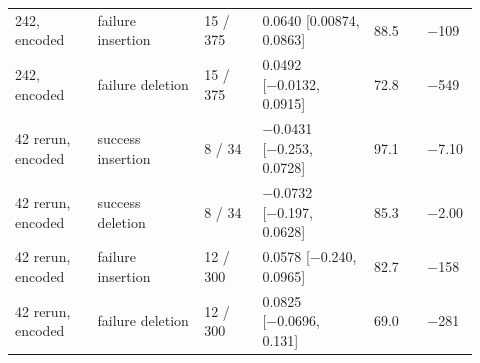 \begin{longtable}{p{0.170\linewidth} p{0.220\linewidth} p{0.120\linewidth} p{0.230\linewidth} p{0.110\linewidth} p{0.070\linewidth}}
242, encoded & failure insertion & 15 / 375 & 0.0640 [0.00874, 0.0863] & 88.5 & −109 \\
242, encoded & failure deletion & 15 / 375 & 0.0492 [−0.0132, 0.0915] & 72.8 & −549 \\
42 rerun, encoded & success insertion & 8 / 34 & −0.0431 [−0.253, 0.0728] & 97.1 & −7.10 \\
42 rerun, encoded & success deletion & 8 / 34 & −0.0732 [−0.197, 0.0628] & 85.3 & −2.00 \\
42 rerun, encoded & failure insertion & 12 / 300 & 0.0578 [−0.240, 0.0965] & 82.7 & −158 \\
42 rerun, encoded & failure deletion & 12 / 300 & 0.0825 [−0.0696, 0.131] & 69.0 & −281 \\
\end{longtable}
